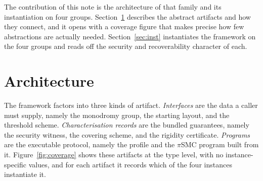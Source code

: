 \documentclass[a4paper,11pt]{article}
\begin{document}
The contribution of this note is the architecture of that family and its
instantiation on four groups. Section~\ref{sec:arch} describes the abstract
artifacts and how they connect, and it opens with a coverage figure that makes
precise how few abstractions are actually needed. Section~\ref{sec:inst}
instantiates the framework on the four groups and reads off the security and
recoverability character of each.

\section{Architecture}
\label{sec:arch}

The framework factors into three kinds of artifact. \emph{Interfaces} are the
data a caller must supply, namely the monodromy group, the starting layout, and
the threshold scheme. \emph{Characterisation records} are the bundled
guarantees, namely the security witness, the covering scheme, and the rigidity
certificate. \emph{Programs} are the executable protocol, namely the profile and
the $\pi$SMC program built from it. Figure~\ref{fig:coverage} shows these
artifacts at the type level, with no instance-specific values, and for each
artifact it records which of the four instances instantiate it.
\end{document}
